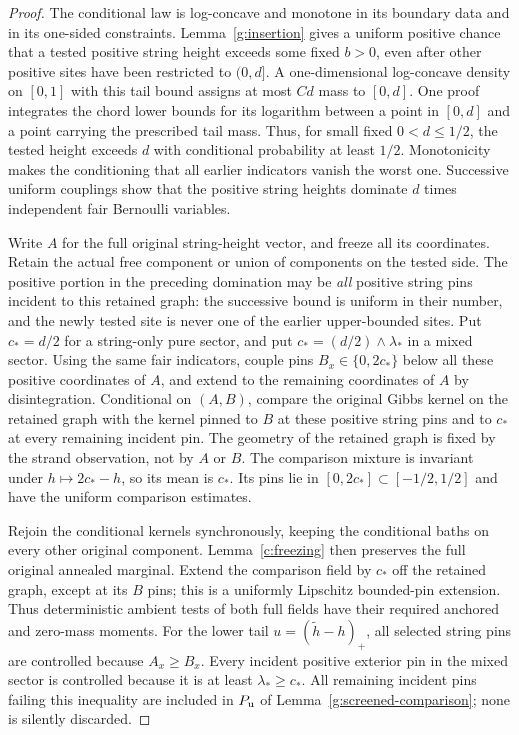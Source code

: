 \begin{proof}
The conditional law is log-concave and monotone in its boundary data and
in its one-sided constraints. Lemma~\ref{g:insertion} gives a uniform
positive chance that a tested positive string height exceeds some
fixed \(b>0\), even after other positive sites have been restricted to
\((0,d]\). A one-dimensional log-concave density on \([0,1]\) with this
tail bound assigns at most \(C d\) mass to \([0,d]\). One proof integrates
the chord lower bounds for its logarithm between a point in \([0,d]\)
and a point carrying the prescribed tail mass. Thus, for small fixed
\(0<d\le1/2\), the tested height exceeds \(d\) with conditional probability at
least \(1/2\). Monotonicity makes the conditioning that all earlier
indicators vanish the worst one. Successive uniform couplings show that
the positive string heights dominate \(d\) times independent fair
Bernoulli variables.

Write $A$ for the full original string-height vector, and freeze all
its coordinates. Retain the actual free component or union of components
on the tested side. The positive portion in the preceding domination
may be \emph{all} positive string pins incident to this retained graph:
the successive bound is uniform in their number, and the newly tested
site is never one of the earlier upper-bounded sites. Put
$c_*=d/2$ for a string-only pure sector, and put
$c_*=(d/2)\wedge\lambda_*$ in a mixed sector. Using the same fair
indicators, couple pins $B_x\in\{0,2c_*\}$ below all these positive
coordinates of $A$, and extend to the remaining coordinates of $A$
by disintegration. Conditional on $(A,B)$, compare the original Gibbs
kernel on the retained graph with the kernel pinned to $B$ at these
positive string pins and to $c_*$ at every remaining incident pin.
The geometry of the retained graph is fixed by the strand observation,
not by $A$ or $B$. The comparison mixture is invariant under
$h\mapsto2c_*-h$, so its mean is $c_*$. Its pins lie in
$[0,2c_*]\subset[-1/2,1/2]$ and have the uniform comparison estimates.

Rejoin the conditional kernels synchronously, keeping the conditional
baths on every other original component. Lemma~\ref{c:freezing} then
preserves the full original annealed marginal. Extend the comparison
field by $c_*$ off the retained graph, except at its $B$ pins; this is
a uniformly Lipschitz bounded-pin extension. Thus deterministic ambient
tests of both full fields have their required anchored and zero-mass
moments. For the lower tail $u=(\widetilde h-h)_+$, all selected string
pins are controlled because $A_x\ge B_x$. Every incident positive
exterior pin in the mixed sector is controlled because it is at least
$\lambda_*\ge c_*$. All remaining incident pins failing this inequality
are included in $P_{\rm u}$ of Lemma~\ref{g:screened-comparison}; none
is silently discarded.


\end{proof}
